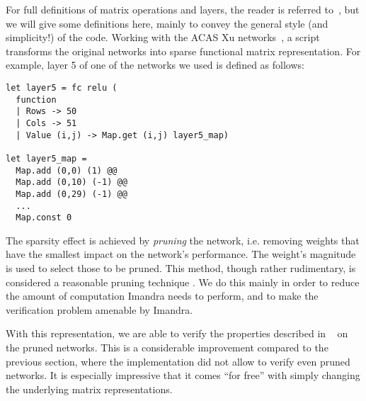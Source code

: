 \documentclass[runningheads]{llncs}
\begin{document}
For full definitions of matrix operations and layers, the reader is referred to~\cite{DPKD22}, but we will give some definitions here, mainly to convey the general style (and simplicity!) of the code.  Working with the ACAS Xu networks~\cite{KaBaDiJuKo17Reluplex}, a script transforms the original networks into sparse functional matrix representation.
For example, layer 5 of one of the networks we used is defined as follows:

\begin{lstlisting}[language=caml]
let layer5 = fc relu (
  function
  | Rows -> 50
  | Cols -> 51
  | Value (i,j) -> Map.get (i,j) layer5_map)

let layer5_map =
  Map.add (0,0) (1) @@
  Map.add (0,10) (-1) @@
  Map.add (0,29) (-1) @@
  ...
  Map.const 0
\end{lstlisting}

\noindent The sparsity effect is achieved by \emph{pruning} the network, i.e. removing weights that have the smallest impact on the network's performance. The weight's magnitude is used to select those to be pruned. This method, though rather rudimentary, is considered a reasonable pruning technique \cite{lecun_optimal_1989}.
%
We do this mainly in order to reduce the amount of computation Imandra needs to perform, and to make the verification problem amenable by Imandra.

With this representation, we are able to verify the properties described in ~\cite{KaBaDiJuKo17Reluplex} on the pruned networks.
This is a considerable improvement compared to the previous section, where the implementation did not allow to verify even pruned networks. It is especially impressive that it comes ``for free'' with simply changing the underlying matrix representations.
\end{document}
